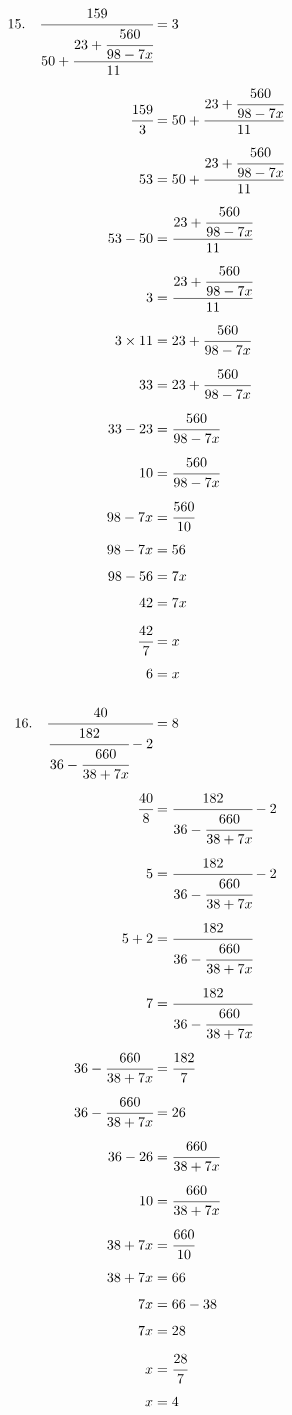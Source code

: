 \documentclass{article}
\begin{document}
\noindent
\begin{minipage}[t]{0.5000\textwidth}
\begin{align*}
15.\hspace{10pt}\cfrac{159}{50+\cfrac{23+\cfrac{560}{98-7x}}{11}}&=3\\[4pt]
\cfrac{159}{3}&=50+\cfrac{23+\cfrac{560}{98-7x}}{11}\\[4pt]
53&=50+\cfrac{23+\cfrac{560}{98-7x}}{11}\\[4pt]
53-50&=\cfrac{23+\cfrac{560}{98-7x}}{11}\\[4pt]
3&=\cfrac{23+\cfrac{560}{98-7x}}{11}\\[4pt]
3\times11&=23+\cfrac{560}{98-7x}\\[4pt]
33&=23+\cfrac{560}{98-7x}\\[4pt]
33-23&=\cfrac{560}{98-7x}\\[4pt]
10&=\cfrac{560}{98-7x}\\[4pt]
98-7x&=\cfrac{560}{10}\\[4pt]
98-7x&=56\\[4pt]
98-56&=7x\\[4pt]
42&=7x\\[4pt]
\cfrac{42}{7}&=x\\[4pt]
6&=x\\[4pt]
\end{align*}
\end{minipage}
\begin{minipage}[t]{0.5000\textwidth}
\begin{align*}
16.\hspace{10pt}\cfrac{40}{\cfrac{182}{36-\cfrac{660}{38+7x}}-2}&=8\\[4pt]
\cfrac{40}{8}&=\cfrac{182}{36-\cfrac{660}{38+7x}}-2\\[4pt]
5&=\cfrac{182}{36-\cfrac{660}{38+7x}}-2\\[4pt]
5+2&=\cfrac{182}{36-\cfrac{660}{38+7x}}\\[4pt]
7&=\cfrac{182}{36-\cfrac{660}{38+7x}}\\[4pt]
36-\cfrac{660}{38+7x}&=\cfrac{182}{7}\\[4pt]
36-\cfrac{660}{38+7x}&=26\\[4pt]
36-26&=\cfrac{660}{38+7x}\\[4pt]
10&=\cfrac{660}{38+7x}\\[4pt]
38+7x&=\cfrac{660}{10}\\[4pt]
38+7x&=66\\[4pt]
7x&=66-38\\[4pt]
7x&=28\\[4pt]
x&=\cfrac{28}{7}\\[4pt]
x&=4\\[4pt]
\end{align*}
\end{minipage}
\vspace{10 mm}
\end{document}
